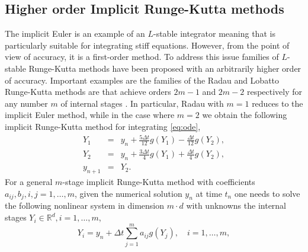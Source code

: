\documentclass[10pt,a4paper]{article}
\def\ts{\thinspace}
\newcommand{\R}{\mathbb{R}}
\renewcommand{\R}{\mathbb{R}}
\begin{document}
        
        
        

       \subsection{Higher order Implicit Runge-Kutta methods}
       \label{subsec:hoirk}
        The implicit Euler is an example of an $L$-stable integrator meaning that is particularly suitable for integrating stiff equations. However, from the point of view of accuracy, it is a first-order method. To address this issue families of $L$-stable {Runge-Kutta methods have been proposed \cite{HaW96}} with an arbitrarily higher order of accuracy. Important examples are the families of the Radau and Lobatto Runge-Kutta methods are that achieve orders $2m-1$ and $2m-2$ respectively for any number $m$ of {internal stages \cite{I96}}. In particular, Radau with $m=1$ reduces to the implicit Euler method, while in the case where $m=2$  we obtain {the following implicit Runge-Kutta method for integrating \eqref{eq:ode},}
        \begin{subequations} \label{eq:radau2}
        \begin{eqnarray} 
         Y_{1}&=& y_{n}+\frac{5\Delta t}{12 }g\left(Y_{1}\right)-\frac{\Delta t}{12}g(Y_{2}), \\
       Y_{2}&=&  y_{n}+\frac{3\Delta t}{4 }g\left(Y_{1}\right)+\frac{\Delta t}{4}g(Y_{2}), \\
       y_{n+1}&=& Y_{2}.
       \end{eqnarray}
       \end{subequations}
  For a general $m$-stage implicit Runge-Kutta method with coefficients $a_{ij},b_j, i,j=1,\ldots,m$, given the numerical solution $y_n$ at time $t_{n}$  one needs to solve the following nonlinear system in dimension $m\cdot d$ with unknowns the internal stages $Y_i\in\R^d,i=1,\ldots,m$,
        \begin{equation}\label{eq:nonlinRK}
            Y_i= y_n + \Delta t \sum_{j=1}^m a_{ij} g(Y_j),\quad i=1,\ldots,m,
        \end{equation}
\end{document}
